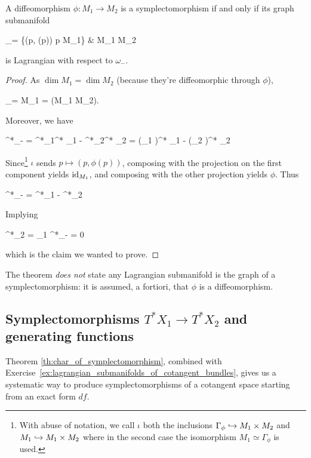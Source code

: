 \documentclass[main.tex]{subfiles}
\begin{document}
\begin{theorem}
\label{th:char_of_symplectomorphism}
	A diffeomorphism $\phi : M_1 \to M_2$ is a symplectomorphism if and only if its graph submanifold
	\begin{diagram}
		\Gamma_\phi = \{(p, \phi(p)) \suchthat p \in M_1\}  \& M_1 \times M_2
	\end{diagram}
	is Lagrangian with respect to $\omega_-$.
\end{theorem}
\begin{proof}
	As $\dim M_1 = \dim M_2$ (because they're diffeomorphic through $\phi$),
	\begin{eqalign}
		\dim \Gamma_\phi = \dim M_1 =  \dim (M_1 \times M_2).
	\end{eqalign}
	Moreover, we have
	\begin{eqalign}
		\iota^*\omega_- = \iota^*\pr_1^* \omega_1 - \iota^*\pr_2^* \omega_2 = (\pr_1 \circ \iota)^* \omega_1 - (\pr_2 \circ \iota)^* \omega_2
	\end{eqalign}
	Since\footnote{With abuse of notation, we call $\iota$ both the inclusions $\Gamma_\phi \hookrightarrow M_1 \times M_2$ and $M_1 \hookrightarrow M_1 \times M_2$ where in the second case the isomorphism $M_1 \simeq \Gamma_\phi$ is used. } $\iota$ sends $p \mapsto (p,\phi(p))$, composing with the projection on the first component yields $\mathrm{id}_{M_1}$, and composing with the other projection yields $\phi$. Thus
	\begin{eqalign}
		\iota^*\omega_- = \id^*\omega_1 - \phi^*\omega_2
	\end{eqalign}
	Implying
	\begin{eqalign}
		\phi^*\omega_2 = \omega_1 \iff \iota^*\omega_- = 0
	\end{eqalign}
	which is the claim we wanted to prove.
\end{proof}

\begin{remark}
	The theorem \emph{does not} state any Lagrangian submanifold is the graph of a symplectomorphism: it is assumed, a fortiori, that $\phi$ is a diffeomorphism.
\end{remark}

\subsection{Symplectomorphisms $T^*X_1 \to T^*X_2$ and generating functions}
Theorem \ref{th:char_of_symplectomorphism}, combined with Exercise~\ref{ex:lagrangian_submanifolds_of_cotangent_bundles}, gives us a systematic way to produce symplectomorphisms of a cotangent space starting from an exact form $df$.
\end{document}
